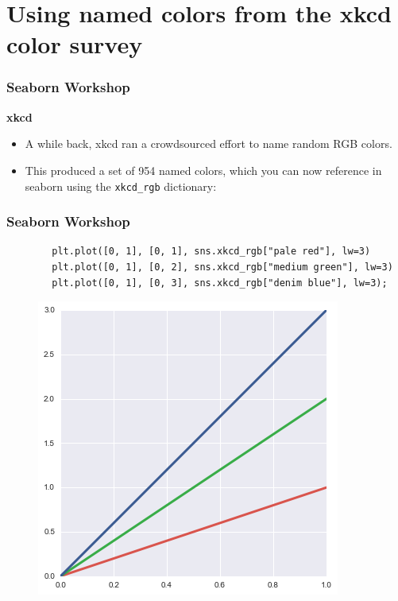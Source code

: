 \documentclass{beamer}
\begin{document}
	\section{Using named colors from the xkcd color survey}
	
	\begin{frame}[fragile]
		\frametitle{Seaborn Workshop}
		\large
		\noindent \textbf{xkcd}
		\begin{itemize}
			\item A while back, xkcd ran a crowdsourced effort to name random RGB colors. 
			\item This produced a set of 954 named colors, which you can now reference in seaborn using the \texttt{xkcd\_rgb} dictionary:
		\end{itemize}
		
	\end{frame}
	\begin{frame}[fragile]
		\frametitle{Seaborn Workshop}
		\large
		\begin{verbatim}
		plt.plot([0, 1], [0, 1], sns.xkcd_rgb["pale red"], lw=3)
		plt.plot([0, 1], [0, 2], sns.xkcd_rgb["medium green"], lw=3)
		plt.plot([0, 1], [0, 3], sns.xkcd_rgb["denim blue"], lw=3);
		\end{verbatim}
		
		\begin{figure}
			\centering
			\includegraphics[width=0.55\linewidth]{images/color_palettes_21_0}
		\end{figure}
	\end{frame}
\end{document}
